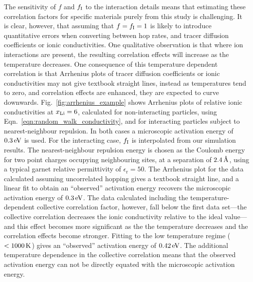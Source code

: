 \documentclass[aps,prb,twocolumn,superscriptaddress,reprint]{revtex4-1}
\newcommand{\xLi}{x_\m{Li}}
\newcommand{\angstrom}{\mbox{\normalfont\AA}}
\begin{document}
The sensitivity of $f$ and $f_{\mathrm{I}}$ to the interaction details means that estimating these correlation factors for specific materials purely from this study is challenging. It is clear, however, that assuming that $f=f_{\mathrm{I}}=1$ is likely to introduce quantitative errors when converting between hop rates, and tracer diffusion coefficients or ionic conductivities. One qualitative observation is that where ion interactions are present, the resulting correlation effects will increase as the temperature decreases. One consequence of this temperature dependent correlation is that Arrhenius plots of tracer diffusion coefficients or ionic conductivities may not give textbook straight lines, instead as temperatures tend to zero, and correlation effects are enhanced, they are expected to curve downwards. Fig.~\ref{fig:arrhenius_example} shows Arrhenius plots of relative ionic conductivities at $\xLi=6$, calculated for non-interacting particles, using Eqn.~\ref{eqn:random_walk_conductivity}, and for interacting particles subject to nearest-neighbour repulsion. In both cases a microscopic activation energy of $0.3\,\mathrm{eV}$ is used. For the interacting case, $f_{\mathrm{I}}$ is interpolated from our simulation results. The nearest-neighbour repulsion energy is chosen as the Coulomb energy for two point charges occupying neighbouring sites, at a separation of $2.4\u{\angstrom}$, using a typical garnet relative permittivity of $\epsilon_\mathrm{r}=50$.\cite{RettenwanderEtAl_InorgChem2015} The Arrhenius plot for the data calculated assuming uncorrelated hopping gives a textbook straight line, and a linear fit to obtain an ``observed'' activation energy recovers the microscopic activation energy of $0.3\,\mathrm{eV}$. The data calculated including the temperature-dependent collective correlation factor, however, fall below the first data set---the collective correlation decreases the ionic conductivity relative to the ideal value---and this effect becomes more significant as the  the temperature decreases and the correlation effects become stronger. Fitting to the low temperature regime ($<1000\,\mathrm{K}$) gives an ``observed'' activation energy of $0.42\,\mathrm{eV}$. The additional temperature dependence in the collective correlation means that the observed activation energy can not be directly equated with the microscopic activation energy.
\end{document}
